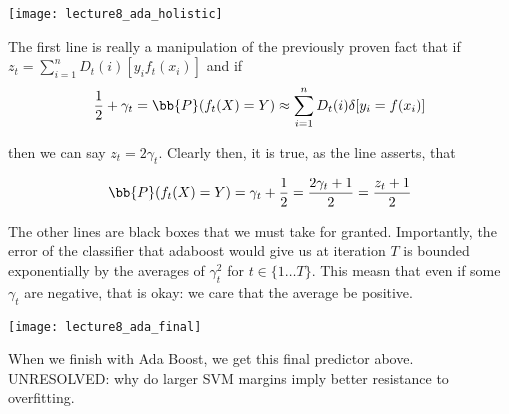 \documentclass[../main.tex]{subfiles}
\begin{document}
    \begin{remark}
    \begin{center}
        \texttt{[image: lecture8\_ada\_holistic]}
    \end{center}

    The first line is really a manipulation of the previously proven fact that
    if $z_t = \sum_{i=1}^{n}D_{t}(i)[y_{i}f_{t}(x_{i})]$ and if 
    \[
        \frac{1}{2} + \gamma_t = \bb{P}(f_t(X) = Y) \approx \sum_{i=1}^{n}D_{t}(i) \delta[y_{i} = f(x_{i})]
    \]

    then we can say $z_t = 2 \gamma_t$. Clearly then, it is true, as the line asserts, that

    \[
    \bb{P}(f_{t}(X) = Y) = \gamma_t + \frac{1}{2} = \frac{2\gamma_t + 1}{2} = \frac{z_{t} + 1}{2}    \]


    The other lines are black boxes that we must take for granted. Importantly, the error
    of the classifier that adaboost would give us at iteration $T$ is bounded exponentially
    by the averages of $\gamma_t^2$ for $t \in \{1 \dots T\}$. This measn that even if
    some $\gamma_t$ are negative, that is okay: we care that the average be positive.

    \begin{center}
        \texttt{[image: lecture8\_ada\_final]}
    \end{center}

    When we finish with Ada Boost, we get this final predictor above. UNRESOLVED: why do
    larger SVM margins imply better resistance to overfitting.
    \end{remark}
\end{document}
